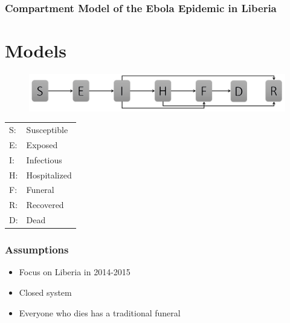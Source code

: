 \documentclass[30pt]{beamer}
\begin{document}
\begin{frame}
\frametitle{Compartment Model of the Ebola Epidemic in Liberia}
\section{Models}

\begin{figure}[!h]
  \centering
  \includegraphics[width=1\textwidth]{compartmentNoFlow}
 \label{fig:compartment} 
\end{figure}

\begin{center}
\begin{tabular}{l l}
 S:& Susceptible\\
 E:& Exposed \\
 I:& Infectious \\
 H:& Hospitalized \\
 F:& Funeral  \\
 R:& Recovered \\
 D:& Dead 
\end{tabular}
\end{center}
\end{frame}



\begin{frame}
\frametitle{Assumptions}
\begin{itemize}
\item Focus on Liberia in 2014-2015
\item Closed system
\item Everyone who dies has a traditional funeral
\end{itemize}
\end{frame}
\end{document}
